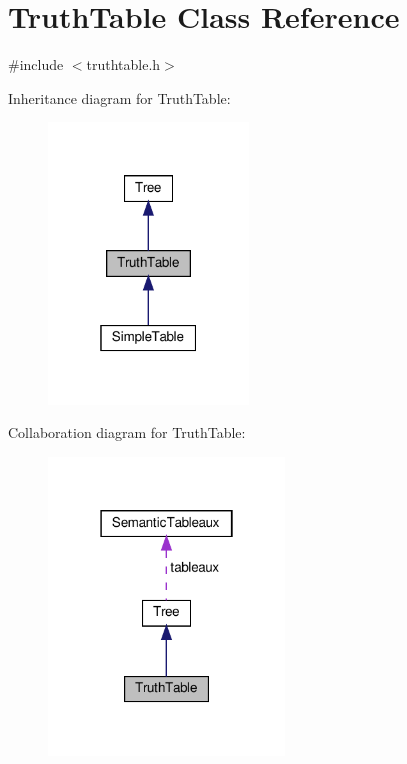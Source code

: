 \hypertarget{class_truth_table}{}\section{Truth\+Table Class Reference}
\label{class_truth_table}


{\ttfamily \#include $<$truthtable.\+h$>$}



Inheritance diagram for Truth\+Table\+:\nopagebreak
\begin{figure}[H]
\begin{center}
\leavevmode
\includegraphics[width=151pt]{d6/d56/class_truth_table__inherit__graph}
\end{center}
\end{figure}


Collaboration diagram for Truth\+Table\+:\nopagebreak
\begin{figure}[H]
\begin{center}
\leavevmode
\includegraphics[width=178pt]{de/d8b/class_truth_table__coll__graph}
\end{center}
\end{figure}
